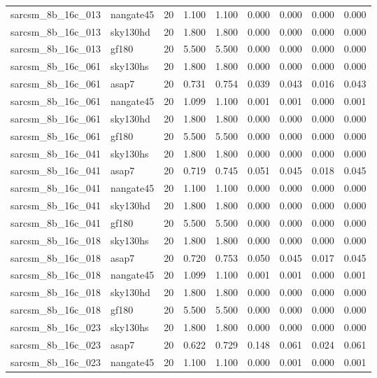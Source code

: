 \begin{tabular}{llrrrrrrr}
sarcsm\_8b\_16c\_013 & nangate45 & 20 & 1.100 & 1.100 & 0.000 & 0.000 & 0.000 & 0.000 \\
sarcsm\_8b\_16c\_013 & sky130hd & 20 & 1.800 & 1.800 & 0.000 & 0.000 & 0.000 & 0.000 \\
sarcsm\_8b\_16c\_013 & gf180 & 20 & 5.500 & 5.500 & 0.000 & 0.000 & 0.000 & 0.000 \\
sarcsm\_8b\_16c\_061 & sky130hs & 20 & 1.800 & 1.800 & 0.000 & 0.000 & 0.000 & 0.000 \\
sarcsm\_8b\_16c\_061 & asap7 & 20 & 0.731 & 0.754 & 0.039 & 0.043 & 0.016 & 0.043 \\
sarcsm\_8b\_16c\_061 & nangate45 & 20 & 1.099 & 1.100 & 0.001 & 0.001 & 0.000 & 0.001 \\
sarcsm\_8b\_16c\_061 & sky130hd & 20 & 1.800 & 1.800 & 0.000 & 0.000 & 0.000 & 0.000 \\
sarcsm\_8b\_16c\_061 & gf180 & 20 & 5.500 & 5.500 & 0.000 & 0.000 & 0.000 & 0.000 \\
sarcsm\_8b\_16c\_041 & sky130hs & 20 & 1.800 & 1.800 & 0.000 & 0.000 & 0.000 & 0.000 \\
sarcsm\_8b\_16c\_041 & asap7 & 20 & 0.719 & 0.745 & 0.051 & 0.045 & 0.018 & 0.045 \\
sarcsm\_8b\_16c\_041 & nangate45 & 20 & 1.100 & 1.100 & 0.000 & 0.000 & 0.000 & 0.000 \\
sarcsm\_8b\_16c\_041 & sky130hd & 20 & 1.800 & 1.800 & 0.000 & 0.000 & 0.000 & 0.000 \\
sarcsm\_8b\_16c\_041 & gf180 & 20 & 5.500 & 5.500 & 0.000 & 0.000 & 0.000 & 0.000 \\
sarcsm\_8b\_16c\_018 & sky130hs & 20 & 1.800 & 1.800 & 0.000 & 0.000 & 0.000 & 0.000 \\
sarcsm\_8b\_16c\_018 & asap7 & 20 & 0.720 & 0.753 & 0.050 & 0.045 & 0.017 & 0.045 \\
sarcsm\_8b\_16c\_018 & nangate45 & 20 & 1.099 & 1.100 & 0.001 & 0.001 & 0.000 & 0.001 \\
sarcsm\_8b\_16c\_018 & sky130hd & 20 & 1.800 & 1.800 & 0.000 & 0.000 & 0.000 & 0.000 \\
sarcsm\_8b\_16c\_018 & gf180 & 20 & 5.500 & 5.500 & 0.000 & 0.000 & 0.000 & 0.000 \\
sarcsm\_8b\_16c\_023 & sky130hs & 20 & 1.800 & 1.800 & 0.000 & 0.000 & 0.000 & 0.000 \\
sarcsm\_8b\_16c\_023 & asap7 & 20 & 0.622 & 0.729 & 0.148 & 0.061 & 0.024 & 0.061 \\
sarcsm\_8b\_16c\_023 & nangate45 & 20 & 1.100 & 1.100 & 0.000 & 0.001 & 0.000 & 0.001 \\

\end{tabular}
